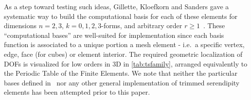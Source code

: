 \documentclass[format=acmsmall,screen,timestamp=false,a4paper]{acmart}
\newcommand\josh[1]{\textbf{\textcolor[rgb]{0,.5,1}{[Josh: #1]}}}
\newcommand{\calP}{\mathcal{P}}
\newcommand{\calS}{\mathcal{S}}
\begin{document}

    
    
  
  

  

	As a step toward testing such ideas, Gillette, Kloefkorn and Sanders gave a systematic way to build the computational basis for each of these elements for dimensions $n = 2, 3$, $k=0, 1, 2, 3$-forms, and arbitrary order $r \geq 1$~\cite{gillette2019computational}.
	These ``computational bases'' are well-suited for implementation since each basis function is associated to a unique portion a mesh element - i.e.\ a specific vertex, edge, face (for cubes) or element interior.
	The required geometric localization of DOFs is visualized for low orders in 3D in \cref{tab:tsfamily}, arranged equivalently to the Periodic Table of the Finite Elements.
	We note that neither the particular bases defined in~\cite{gillette2019computational} nor any other general implementation of trimmed serendipity elements has been attempted prior to this paper.
\end{document}
